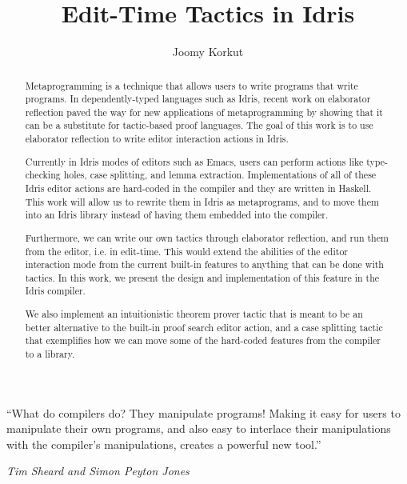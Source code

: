 \documentclass[11pt, ma]{westhesis}
\title{Edit-Time Tactics in Idris}
\author{Joomy Korkut}
\theoremstyle{plain}
\theoremstyle{definition}
\numberwithin{section}{chapter}
\numberwithin{figure}{chapter}
\begin{document}
\begin{abstract}
  Metaprogramming is a technique that allows users to write programs that
  write programs. In dependently-typed languages such as Idris, recent work on
  elaborator reflection paved the way for new applications of metaprogramming
  by showing that it can be a substitute for tactic-based proof languages.
  The goal of this work is to use elaborator reflection to write editor
  interaction actions in Idris.

  Currently in Idris modes of editors such as Emacs, users can perform actions
  like type-checking holes, case splitting, and lemma extraction.
  Implementations of all of these Idris editor actions are hard-coded in the
  compiler and they are written in Haskell. This work will allow us to rewrite
  them in Idris as metaprograms, and to move them into an Idris library instead
  of having them embedded into the compiler.

  Furthermore, we can write our own tactics through elaborator
  reflection, and run them from the editor, i.e. in edit-time.
  This would extend the abilities of the editor interaction mode from the
  current built-in features to anything that can be done with tactics.
  In this work, we present the design and implementation of this feature in the
  Idris compiler.

  We also implement an intuitionistic theorem prover tactic that is meant to be an
  better alternative to the built-in proof search editor action, and a case
  splitting tactic that exemplifies how we can move some of the hard-coded
  features from the compiler to a library.
\end{abstract}

\begin{dedication}
  \epigraph{``What do compilers do? They manipulate programs! Making it easy
  for users to manipulate their own programs, and also easy to interlace their
  manipulations with the compiler’s manipulations, creates a powerful new
  tool.''}{\textit{Tim Sheard and Simon Peyton Jones}\cite{th}}
\end{dedication}
\end{document}
